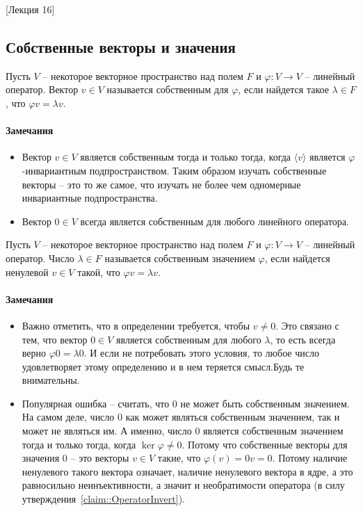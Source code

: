 [Лекция 16]


\subsection{Собственные векторы и значения}

\begin{definition}
Пусть $V$ -- некоторое векторное пространство над полем $F$ и $\varphi \colon V\to V$ -- линейный оператор.
Вектор $v\in V$ называется собственным для $\varphi$, если найдется такое $\lambda \in F$, что $\varphi v = \lambda v$.
\end{definition}

\paragraph{Замечания}

\begin{itemize}
\item Вектор $v\in V$ является собственным тогда и только тогда, когда $\langle v \rangle$ является $\varphi$-инвариантным подпространством.
Таким образом изучать собственные векторы -- это то же самое, что изучать не более чем одномерные инвариантные подпространства.

\item Вектор $0\in V$ всегда является собственным для любого линейного оператора.
\end{itemize}

\begin{definition}
Пусть $V$ -- некоторое векторное пространство над полем $F$ и $\varphi \colon V\to V$ -- линейный оператор.
Число $\lambda \in F$ называется собственным значением $\varphi$, если найдется ненулевой $v\in V$ такой, что $\varphi v = \lambda v$.
\end{definition}

\paragraph{Замечания}

\begin{itemize}
\item Важно отметить, что в определении требуется, чтобы $v\neq 0$.
Это связано с тем, что вектор $0\in V$ является собственным для любого $\lambda$, то есть всегда верно $\varphi 0 = \lambda 0$.
И если не потребовать этого условия, то любое число удовлетворяет этому определению и в нем теряется смысл.Будь те внимательны.

\item Популярная ошибка -- считать, что $0$ не может быть собственным значением.
На самом деле, число $0$ как может являться собственным значением, так и может не являться им.
А именно, число $0$ является собственным значением тогда и только тогда, когда $\ker \varphi \neq 0$.
Потому что собственные векторы для значения $0$ -- это векторы $v\in V$ такие, что $\varphi(v) = 0 v = 0$.
Потому наличие ненулевого такого вектора означает, наличие ненулевого вектора в ядре, а это равносильно неинъективности, а значит и необратимости оператора (в силу утверждения~\ref{claim::OperatorInvert}).
\end{itemize}

